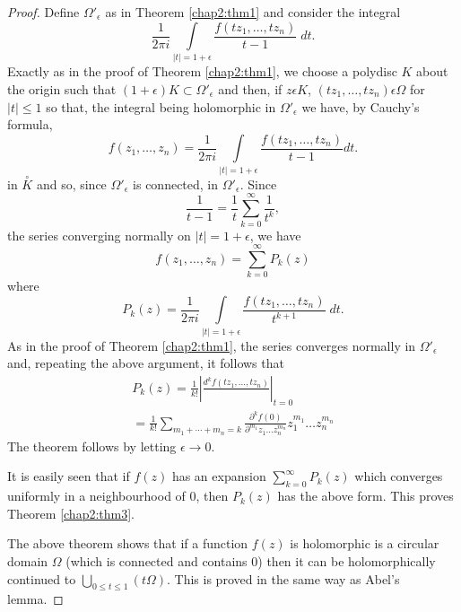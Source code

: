 \begin{proof}
Define $\Omega'_\epsilon$ as in Theorem \ref{chap2:thm1} and consider
the integral  
$$
\frac{1}{2\pi i} \int\limits_{|t| = 1 + \epsilon} \frac{f(t z_1, \ldots,
  tz_n)}{t-1} \; dt. 
$$
Exactly as in the proof of Theorem \ref{chap2:thm1}, we choose a polydisc $K$ about
the origin such that $(1+\epsilon) K \subset \Omega'_\epsilon$ and then, if $z
\epsilon K$, $(t z_1, \ldots, tz_n) \epsilon \Omega$ for $|t| \leq 1$ so that,
the integral being holomorphic in $\Omega'_\epsilon$ we have, by Cauchy's
formula, 
$$
f(z_1, \ldots, z_n) = \frac{1}{2 \pi i} \int\limits_{|t| = 1+\epsilon}
\frac{f(tz_1, \ldots, tz_n)}{t-1} dt.
$$
in $\overset{\circ}{K}$ and so, since $\Omega'_\epsilon$ is connected, in
$\Omega'_\epsilon$. Since
$$
\frac{1}{t-1} = \frac{1}{t} \sum\limits^\infty_{k=0} \frac{1}{t^k}, 
$$
the series converging normally on $|t| = 1+ \epsilon$, we have
$$
f(z_1, \ldots, z_n) = \sum\limits^\infty_{k=0} P_k(z)
$$
where
$$
P_k (z) = \frac{1}{2\pi i} \int\limits_{|t|=1+\epsilon} \frac{f(tz_1,
  \ldots, tz_n)}{t^{k+1}} \; dt.
$$\pageoriginale
As in the proof of Theorem \ref{chap2:thm1}, the series converges normally in
$\Omega'_\epsilon$ and, repeating the above argument, it follows that 
\begin{gather*} 
P_k (z) = \frac{1}{k!} \left|\frac{d^k f(t z_1, \ldots, tz_n)}{}
\right|_{t=0} \\
= \frac{1}{k!} \sum\limits_{m_1 + \cdots + m_n = k} \frac{\partial^k
  f(0)}{\partial^{m_1} z_1 \ldots z^{m_n}_n} z^{m_1}_1 \ldots z^{m_n}_n
\end{gather*}
The theorem follows by letting $\epsilon \to 0$.

It is easily seen that if $f(z)$ has an expansion
$\sum\limits^\infty_{k=0}P_k (z)$ which converges uniformly in a
neighbourhood of $0$, then $P_k (z)$ has the above form. This proves
Theorem \ref{chap2:thm3}. 

The above theorem shows that if a function $f(z)$ is holomorphic is a
circular domain $\Omega$ (which is connected and contains 0) then it
can be holomorphically continued to $\bigcup\limits_{0\leq t \leq 1}
(t\Omega)$. This is proved in the same way as Abel's lemma. 
\end{proof}
